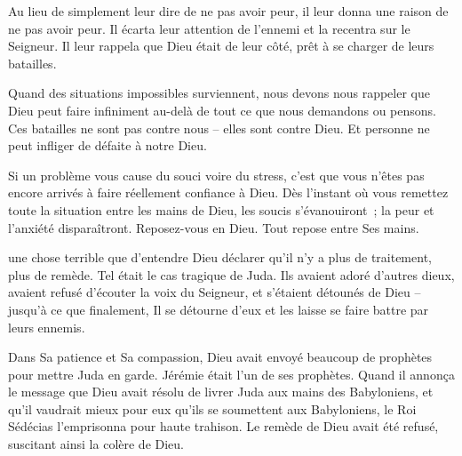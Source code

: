 Au lieu de simplement leur dire de ne pas avoir peur,
 il leur donna une raison de ne pas avoir peur.
 Il écarta leur attention de l'ennemi et la recentra sur le Seigneur.
 Il leur rappela que Dieu était de leur côté,
 prêt à se charger de leurs batailles.


Quand des situations impossibles surviennent,
 nous devons nous rappeler que Dieu peut faire infiniment au-delà
 de tout ce que nous demandons ou pensons.
 Ces batailles ne sont pas contre nous -- elles sont contre Dieu.
 Et personne ne peut infliger de défaite à notre Dieu.

Si un problème vous cause du souci voire du stress,
 c'est que vous n'êtes pas encore arrivés à faire réellement
 confiance à Dieu.
 Dès l'instant où vous remettez toute la situation entre les mains de Dieu,
 les soucis s'évanouiront~; la peur et l'anxiété disparaîtront.
 Reposez-vous en Dieu. Tout repose entre Ses mains. 

\dvrule







 une chose terrible que d'entendre Dieu déclarer
 qu'il n'y a plus de traitement, plus de remède.
 Tel était le cas tragique de Juda.
 Ils avaient adoré d'autres dieux, avaient refusé d'écouter
 la voix du Seigneur, et s'étaient détounés de Dieu
 -- jusqu'à ce que finalement, Il se détourne d'eux
 et les laisse se faire battre par leurs ennemis. 


Dans Sa patience et Sa compassion, Dieu avait envoyé beaucoup de prophètes
 pour mettre Juda en garde.
 Jérémie était l'un de ses prophètes.
 Quand il annonça le message que Dieu avait résolu de livrer Juda
 aux mains des Babyloniens,
 et qu'il vaudrait mieux pour eux qu'ils se soumettent aux Babyloniens,
 le Roi Sédécias l'emprisonna pour haute trahison.
 Le remède de Dieu avait été refusé, suscitant ainsi la colère de Dieu.

